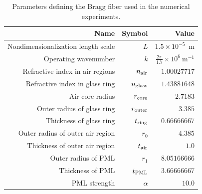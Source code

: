 \documentclass[12pt, oneside, reqno]{amsart}
\theoremstyle{remark}
\begin{document}
\begin{table}%
  \centering
  \begin{tabular}{r r r}
    \toprule
    Name & Symbol & Value \\
    \midrule
    Nondimensionalization length scale & \(L\) & \(1.5 \times 10^{-5}\)~m \\
    Operating wavenumber & \(k\) & \(\frac{2 \pi}{1.7} \times 10^{6}~\text{m}^{-1}\) \\
    Refractive index in air regions & \(n_{\rm air}\) & \(1.00027717\) \\
    Refractive index in glass ring & \(n_{\rm glass}\) & \(1.43881648\) \\
    Air core radius & \(r_{\rm core}\) & \(2.7183\) \\
    Outer radius of glass ring & \(r_{\rm outer}\) & \(3.385\) \\
    Thickness of glass ring & \(t_{\rm ring}\) & \(0.66666667\) \\
    Outer radius of outer air region & \(r_{0}\) & \(4.385\) \\
    Thickness of outer air region & \(t_{\rm air}\) & \(1.0\) \\
    Outer radius of PML & \(r_{1}\) & \(8.05166666\) \\
    Thickness of PML & \(t_{\rm PML}\) & \(3.66666667\) \\
    PML strength & \(\alpha\) & \(10.0\) \\
    \bottomrule
  \end{tabular}
  \caption{Parameters defining the Bragg fiber used in the numerical
  experiments.}
  \label{tab:bragg-fiber-params}
\end{table}
\end{document}
